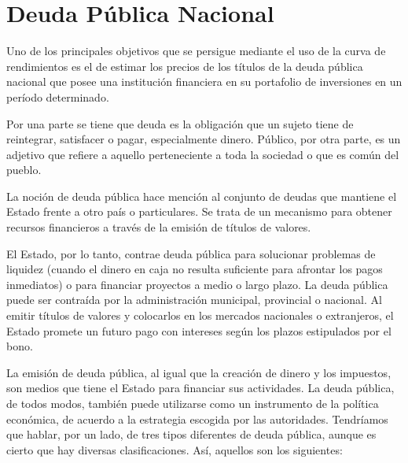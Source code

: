 \section{Deuda P\'ublica Nacional}

\hspace*{0.4 cm} Uno de los principales objetivos que se persigue mediante el uso de la curva de rendimientos es el de estimar los precios de los t\'itulos de la deuda p\'ublica nacional que posee una instituci\'on financiera en su portafolio de inversiones en un per\'iodo determinado. 


\hspace*{0.4 cm} Por una parte se tiene que deuda es la obligaci\'on que un sujeto tiene de reintegrar, satisfacer o pagar, especialmente dinero. P\'ublico, por otra parte, es un adjetivo que refiere a aquello perteneciente a toda la sociedad o que es com\'un del pueblo.

\hspace*{0.4 cm} La noci\'on de deuda p\'ublica hace menci\'on al conjunto de deudas que mantiene el Estado frente a otro pa\'is o particulares. Se trata de un mecanismo para obtener recursos financieros a trav\'es de la emisi\'on de t\'itulos de valores.

\hspace*{0.4 cm} El Estado, por lo tanto, contrae deuda p\'ublica para solucionar problemas de liquidez (cuando el dinero en caja no resulta suficiente para afrontar los pagos inmediatos) o para financiar proyectos a medio o largo plazo. La deuda p\'ublica puede ser contra\'ida por la administraci\'on municipal, provincial o nacional. Al emitir t\'itulos de valores y colocarlos en los mercados nacionales o extranjeros, el Estado promete un futuro pago con intereses seg\'un los plazos estipulados por el bono.

\hspace*{0.4 cm} La emisi\'on de deuda p\'ublica, al igual que la creaci\'on de dinero y los impuestos, son medios que tiene el Estado para financiar sus actividades. La deuda p\'ublica, de todos modos, tambi\'en puede utilizarse como un instrumento de la pol\'itica econ\'omica, de acuerdo a la estrategia escogida por las autoridades. Tendr\'iamos que hablar, por un lado, de tres tipos diferentes de deuda p\'ublica, aunque es cierto que hay diversas clasificaciones. As\'i, aquellos son los siguientes:

